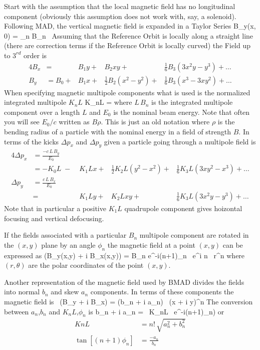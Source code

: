 Start with the assumption that the local magnetic field has no
longitudinal component (obviously this assumption does not work with,
say, a solenoid).  Following MAD, the vertical magnetic field is
expanded in a Taylor Series
\Begineq
  B_y(x, 0) = \sum_n B_n \, 
\Endeq
Assuming that the Reference Orbit is locally along a straight line
(there are correction terms if the Reference Orbit is locally curved) the 
Field up to $3^{rd}$ order is
\begin{alignat}{4}
  B_x &=        &B_1 y \plus &B_2 xy \plus 
                            & \frac{1}{6} B_3 (3x^2 y - y^3) \plus \ldots \\
  B_y &= B_0 \plus  &B_1 x \plus & \frac{1}{2} B_2 (x^2 - y^2) \plus 
                            & \frac{1}{6} B_3 (x^3 - 3x y^2) \plus \ldots
\end{alignat}
When specifying magnetic multipole components what is used is the
normalized integrated multipole $K_nL$
\Begineq
  K_nL = 
\Endeq
where $L \, B_n$ is the integrated multipole component over a length
$L$ and $E_0$ is the nominal beam energy. Note that often you will see
$E_0/c$ written as $B\rho$. This is just an old notation where $\rho$
is the bending radius of a particle with the nominal energy in a field
of strength $B$. In terms of the kicks $\Delta p_x$ and $\Delta p_y$
given a particle going through a multipole field is
\begin{alignat}{4}
  \Delta p_x &= \frac{-c\, L \, B_y}{E_0} \\
             &= -K_0L \;-\; &K_1L x \plus & \frac{1}{2} K_2L (y^2 - x^2) \plus 
             & \frac{1}{6} K_3L (3x y^2 - x^3) \plus \ldots \\
  \Delta p_y &= \frac{c\, L \, B_x}{E_0} \\
             &=        &K_1L y \plus &K_2L xy \plus 
             & \frac{1}{6} K_3L (3x^2 y - y^3) \plus \ldots 
\end{alignat}
Note that in particular a positive $K_1L$ quadrupole component gives
hoizontal focusing and vertical defocusing. 

If the fields associated with a particular $B_n$ multipole component
are rotated in the $(x, y)$ plane by an angle $\phi_n$ the magnetic
field at a point $(x,y)$ can be expressed as
\Begineq
  (B_y(x,y) + i B_x(x,y)) = 
                 B_n e^{-i(n+1)\phi_n} \, e^{i n \theta} \, r^n 
\Endeq
where $(r, \theta)$ are the polar coordinates of the point $(x, y)$.

Another representation of the magnetic field used by BMAD divides the
fields into normal $b_n$ and skew $a_n$ components. In terms of these
components the magnetic field is
\Begineq
   \, (B_y + i B_x) = (b_n + i a_n) \, (x + i y)^n
\Endeq
The conversion between $a_n$,$b_n$ and $K_nL$,$\phi_n$ is
\Begineq
  b_n + i a_n =  \, K_nL \, e^{-i(n+1)\phi_n)}
\Endeq
or
\begin{align}
  KnL &= n! \, \sqrt{a_n^2 + b_n^2} \\
  \tan[(n+1) \phi_n] &= \frac{-a_n}{b_n}
\end{align}

